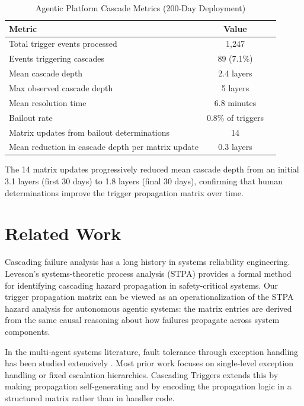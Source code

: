 \documentclass[12pt]{article}
\begin{document}
\begin{table}[htbp]
\begin{center}
\caption{Agentic Platform Cascade Metrics (200-Day Deployment)}
\label{tab:cascade-metrics}
\begin{tabular}{lcc}
\toprule
\textbf{Metric} & \textbf{Value} \\
\midrule
Total trigger events processed & 1,247 \\
Events triggering cascades & 89 (7.1\%) \\
Mean cascade depth & 2.4 layers \\
Max observed cascade depth & 5 layers \\
Mean resolution time & 6.8 minutes \\
Bailout rate & 0.8\% of triggers \\
Matrix updates from bailout determinations & 14 \\
Mean reduction in cascade depth per matrix update & 0.3 layers \\
\bottomrule
\end{tabular}
\end{center}
\end{table}

The 14 matrix updates progressively reduced mean cascade depth from an initial 3.1 layers (first 30 days) to 1.8 layers (final 30 days), confirming that human determinations improve the trigger propagation matrix over time.

\section{Related Work}
\label{sec:related}

Cascading failure analysis has a long history in systems reliability engineering. Leveson's systems-theoretic process analysis (STPA) \cite{leveson2011} provides a formal method for identifying cascading hazard propagation in safety-critical systems. Our trigger propagation matrix can be viewed as an operationalization of the STPA hazard analysis for autonomous agentic systems: the matrix entries are derived from the same causal reasoning about how failures propagate across system components.

In the multi-agent systems literature, fault tolerance through exception handling has been studied extensively \cite{ferrarotti2016}. Most prior work focuses on single-level exception handling or fixed escalation hierarchies. Cascading Triggers extends this by making propagation self-generating and by encoding the propagation logic in a structured matrix rather than in handler code.
\end{document}
